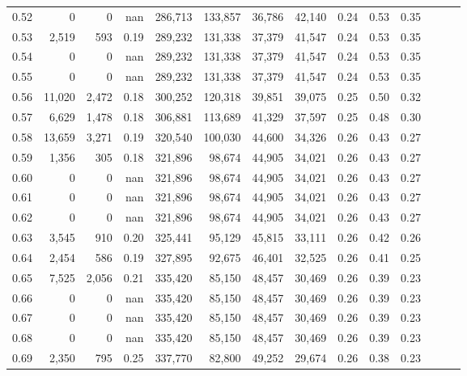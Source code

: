 \begin{tabular}{rrrrrrrrrrrrrr}
0.52 &       0 &      0 &   nan &  286,713 &  133,857 &  36,786 &  42,140 &  0.24 &  0.53 &      0.35 \\
0.53 &   2,519 &    593 &  0.19 &  289,232 &  131,338 &  37,379 &  41,547 &  0.24 &  0.53 &      0.35 \\
0.54 &       0 &      0 &   nan &  289,232 &  131,338 &  37,379 &  41,547 &  0.24 &  0.53 &      0.35 \\
0.55 &       0 &      0 &   nan &  289,232 &  131,338 &  37,379 &  41,547 &  0.24 &  0.53 &      0.35 \\
0.56 &  11,020 &  2,472 &  0.18 &  300,252 &  120,318 &  39,851 &  39,075 &  0.25 &  0.50 &      0.32 \\
0.57 &   6,629 &  1,478 &  0.18 &  306,881 &  113,689 &  41,329 &  37,597 &  0.25 &  0.48 &      0.30 \\
0.58 &  13,659 &  3,271 &  0.19 &  320,540 &  100,030 &  44,600 &  34,326 &  0.26 &  0.43 &      0.27 \\
0.59 &   1,356 &    305 &  0.18 &  321,896 &   98,674 &  44,905 &  34,021 &  0.26 &  0.43 &      0.27 \\
0.60 &       0 &      0 &   nan &  321,896 &   98,674 &  44,905 &  34,021 &  0.26 &  0.43 &      0.27 \\
0.61 &       0 &      0 &   nan &  321,896 &   98,674 &  44,905 &  34,021 &  0.26 &  0.43 &      0.27 \\
0.62 &       0 &      0 &   nan &  321,896 &   98,674 &  44,905 &  34,021 &  0.26 &  0.43 &      0.27 \\
0.63 &   3,545 &    910 &  0.20 &  325,441 &   95,129 &  45,815 &  33,111 &  0.26 &  0.42 &      0.26 \\
0.64 &   2,454 &    586 &  0.19 &  327,895 &   92,675 &  46,401 &  32,525 &  0.26 &  0.41 &      0.25 \\
0.65 &   7,525 &  2,056 &  0.21 &  335,420 &   85,150 &  48,457 &  30,469 &  0.26 &  0.39 &      0.23 \\
0.66 &       0 &      0 &   nan &  335,420 &   85,150 &  48,457 &  30,469 &  0.26 &  0.39 &      0.23 \\
0.67 &       0 &      0 &   nan &  335,420 &   85,150 &  48,457 &  30,469 &  0.26 &  0.39 &      0.23 \\
0.68 &       0 &      0 &   nan &  335,420 &   85,150 &  48,457 &  30,469 &  0.26 &  0.39 &      0.23 \\
0.69 &   2,350 &    795 &  0.25 &  337,770 &   82,800 &  49,252 &  29,674 &  0.26 &  0.38 &      0.23 \\

\end{tabular}
